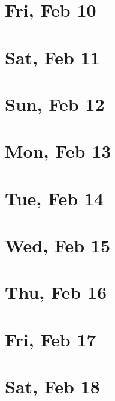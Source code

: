 	\section{Fri, Feb 10}
		
		
	\section{Sat, Feb 11}
		
		
	\section{Sun, Feb 12}
		
		
	\section{Mon, Feb 13}
		
		
	\section{Tue, Feb 14}
		
		
	\section{Wed, Feb 15}
		
		
	\section{Thu, Feb 16}
		
		
	\section{Fri, Feb 17}
		
		
	\section{Sat, Feb 18}
		
		
